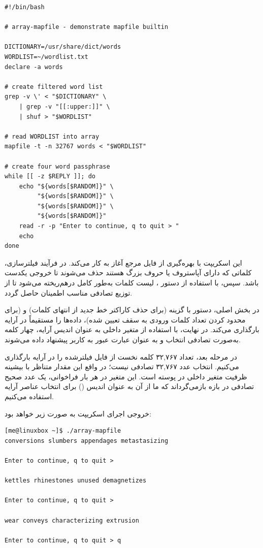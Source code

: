 \begin{latin}
\begin{lstlisting}
#!/bin/bash

# array-mapfile - demonstrate mapfile builtin

DICTIONARY=/usr/share/dict/words
WORDLIST=~/wordlist.txt
declare -a words

# create filtered word list
grep -v \' < "$DICTIONARY" \
    | grep -v "[[:upper:]]" \
    | shuf > "$WORDLIST"

# read WORDLIST into array
mapfile -t -n 32767 words < "$WORDLIST"

# create four word passphrase
while [[ -z $REPLY ]]; do
    echo "${words[$RANDOM]}" \
         "${words[$RANDOM]}" \
         "${words[$RANDOM]}" \
         "${words[$RANDOM]}"
    read -r -p "Enter to continue, q to quit > "
    echo
done
\end{lstlisting}
\end{latin}

این اسکریپت با بهره‌گیری از فایل مرجع  آغاز به کار می‌کند. در فرآیند فیلترسازی، کلماتی که دارای آپاستروف یا حروف بزرگ هستند حذف می‌شوند تا خروجی یکدست باشد. سپس، با استفاده از دستور ، لیست کلمات به‌طور کامل درهم‌ریخته می‌شود تا از توزیع تصادفی مناسب اطمینان حاصل گردد.

در بخش اصلی، دستور  با گزینه  (برای حذف کاراکتر خط جدید از انتهای کلمات) و  (برای محدود کردن تعداد کلمات ورودی به سقف تعیین شده)، داده‌ها را مستقیماً در آرایه  بارگذاری می‌کند. در نهایت، با استفاده از متغیر داخلی  به عنوان اندیس آرایه، چهار کلمه به‌صورت تصادفی انتخاب و به عنوان عبارت عبور به کاربر پیشنهاد داده می‌شوند.

در مرحله بعد، تعداد ۳۲,۷۶۷ کلمه نخست از فایل فیلترشده را در آرایه  بارگذاری می‌کنیم. انتخاب عدد ۳۲,۷۶۷ تصادفی نیست؛ در واقع این مقدار متناظر با بیشینه ظرفیت متغیر داخلی  در پوسته  است. این متغیر در هر بار فراخوانی، یک عدد صحیح تصادفی در بازه \cmd{[0,32767]} بازمی‌گرداند که ما از آن به عنوان اندیس () برای انتخاب عناصر آرایه استفاده می‌کنیم.

خروجی اجرای اسکریپت به صورت زیر خواهد بود:

\begin{latin}
\begin{lstlisting}
[me@linuxbox ~]$ ./array-mapfile
conversions slumbers appendages metastasizing

Enter to continue, q to quit >

kettles rhinestones unused demagnetizes

Enter to continue, q to quit >

wear conveys characterizing extrusion

Enter to continue, q to quit > q
\end{lstlisting}
\end{latin}

